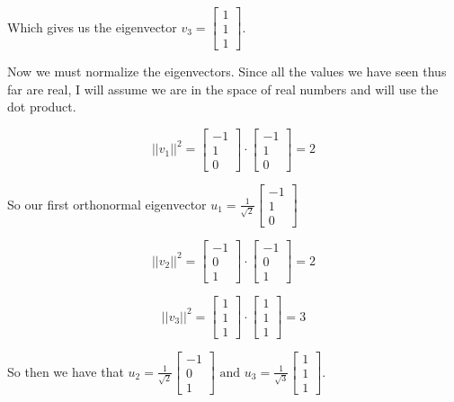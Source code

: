 \documentclass[12pt, letterpaper]{article}
\begin{document}
Which gives us the eigenvector $v_3 = \begin{bmatrix} 1 \\ 1 \\ 1 \end{bmatrix}$. 

Now we must normalize the eigenvectors. Since all the values we have seen thus far are real, I will assume we are in the space of real numbers and will use the dot product.

\[ ||v_1||^2 = \begin{bmatrix} -1 \\ 1 \\ 0 \end{bmatrix} \cdot \begin{bmatrix} -1 \\ 1 \\ 0 \end{bmatrix} = 2 \]

So our first orthonormal eigenvector $u_1 = \frac{1}{\sqrt{2}} \begin{bmatrix} -1 \\ 1 \\ 0 \end{bmatrix}$

\[ ||v_2||^2 = \begin{bmatrix} -1 \\ 0 \\ 1 \end{bmatrix} \cdot \begin{bmatrix} -1 \\ 0 \\ 1 \end{bmatrix} = 2 \]

\[ ||v_3||^2 = \begin{bmatrix} 1 \\ 1 \\ 1 \end{bmatrix} \cdot \begin{bmatrix} 1 \\ 1 \\ 1 \end{bmatrix} = 3 \]

So then we have that $u_2 = \frac{1}{\sqrt{2}} \begin{bmatrix} -1 \\ 0 \\ 1 \end{bmatrix} \text{ and } u_3 = \frac{1}{\sqrt{3}} \begin{bmatrix} 1 \\ 1 \\ 1 \end{bmatrix}$. 
\end{document}
